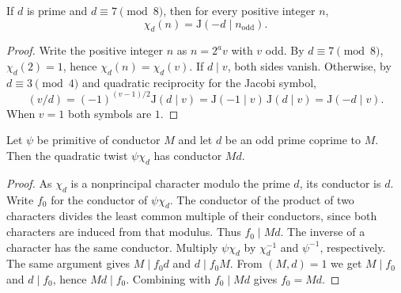 \begin{lemma}
\label{lem:twist-reciprocity}
\emitthmsource
If $d$ is prime and $d\equiv7\pmod8$, then for every positive integer $n$,
\[
 \chi_d(n)=\mathrm J(-d\mid n_{\mathrm{odd}}).
\]
\end{lemma}
\begin{proof}
Write the positive integer $n$ as $n=2^a v$ with $v$ odd. By $d\equiv7\pmod8$,
$\chi_d(2)=1$, hence $\chi_d(n)=\chi_d(v)$.
If $d\mid v$, both sides vanish. Otherwise, by $d\equiv3\pmod4$ and quadratic reciprocity for the Jacobi symbol,
\[
 (v/d)=(-1)^{(v-1)/2}\mathrm J(d\mid v)
       =\mathrm J(-1\mid v)\,\mathrm J(d\mid v)
       =\mathrm J(-d\mid v).
\]
When $v=1$ both symbols are $1$.
\end{proof}

\begin{lemma}
\label{lem:twist-primitivity}
\emitthmsource
Let $\psi$ be primitive of conductor $M$ and let $d$ be an odd prime coprime to $M$. Then the quadratic twist $\psi\chi_d$ has conductor $Md$.
\end{lemma}
\begin{proof}
As $\chi_d$ is a nonprincipal character modulo the prime $d$, its conductor is $d$.
Write $f_0$ for the conductor of $\psi\chi_d$.
The conductor of the product of two characters divides the least common multiple of their conductors, since both characters are induced from that modulus. Thus $f_0\mid Md$.
The inverse of a character has the same conductor. Multiply $\psi\chi_d$ by $\chi_d^{-1}$ and $\psi^{-1}$, respectively.
The same argument gives $M\mid f_0d$ and $d\mid f_0M$.
From $(M,d)=1$ we get $M\mid f_0$ and $d\mid f_0$, hence $Md\mid f_0$. Combining with $f_0\mid Md$ gives $f_0=Md$.
\end{proof}

